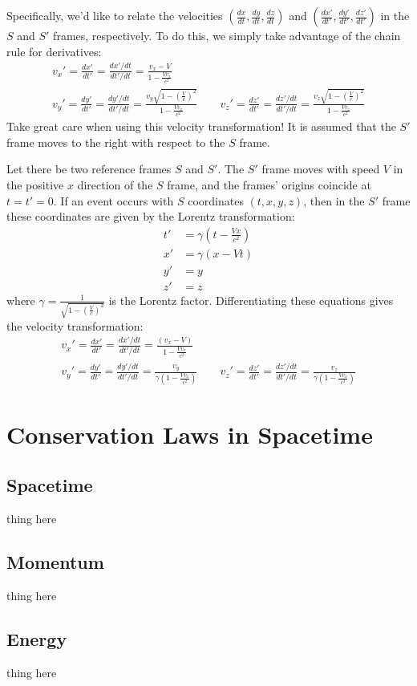 \documentclass[10pt,a4paper,oneside]{book}
\begin{document}
Specifically, we'd like to relate the velocities $\left( \frac{dx}{dt}, \frac{dy}{dt}, \frac{dz}{dt} \right)$ and $\left( \frac{dx'}{dt'}, \frac{dy'}{dt'}, \frac{dz'}{dt'} \right)$ in the $S$ and $S'$ frames, respectively.
To do this, we simply take advantage of the chain rule for derivatives:
\begin{gather*}
    v_x' = \frac{dx'}{dt'} = \frac{dx'/dt}{dt'/dt} = \frac{v_x - V}{1 - \frac{Vv_x}{c^2}} \\
    v_y' = \frac{dy'}{dt'} = \frac{dy'/dt}{dt'/dt} = \frac{v_y\sqrt{1 - \left( \frac{V}{c} \right)^2}}{1 - \frac{Vv_x}{c^2}} \qquad
    v_z' = \frac{dz'}{dt'} = \frac{dz'/dt}{dt'/dt} = \frac{v_z\sqrt{1 - \left( \frac{V}{c} \right)^2}}{1 - \frac{Vv_z}{c^2}}
\end{gather*}
Take great care when using this velocity transformation!
It is assumed that the $S'$ frame moves to the right with respect to the $S$ frame.

\begin{summary}
    Let there be two reference frames $S$ and $S'$.
    The $S'$ frame moves with speed $V$ in the positive $x$ direction of the $S$ frame, and the frames' origins coincide at $t = t' = 0$.
    If an event occurs with $S$ coordinates $(t, x, y, z)$, then in the $S'$ frame these coordinates are given by the Lorentz transformation:
    \begin{align*}
        t' &= \gamma \left( t - \frac{Vx}{c^2} \right) \\
        x' &= \gamma \left( x - Vt \right) \\
        y' &= y \\
        z' &= z
    \end{align*}
    where $\gamma = \frac{1}{\sqrt{1 - \left( \frac{V}{c} \right)^2}}$ is the Lorentz factor.
    Differentiating these equations gives the velocity transformation:
    \begin{gather*}
        v_x' = \frac{dx'}{dt'} = \frac{dx'/dt}{dt'/dt} = \frac{(v_x - V)}{1 - \frac{Vv_x}{c^2}} \\
        v_y' = \frac{dy'}{dt'} = \frac{dy'/dt}{dt'/dt} = \frac{v_y}{\gamma \left( 1 - \frac{Vv_x}{c^2} \right)} \qquad
        v_z' = \frac{dz'}{dt'} = \frac{dz'/dt}{dt'/dt} = \frac{v_z}{\gamma \left( 1 - \frac{Vv_x}{c^2} \right)}
    \end{gather*}
\end{summary}


\chapter{Conservation Laws in Spacetime}
\section{Spacetime}
thing here

\section{Momentum}
thing here

\section{Energy}
thing here
\end{document}
